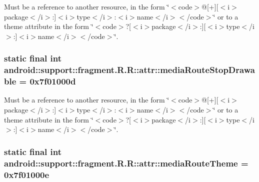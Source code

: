 Must be a reference to another resource, in the form \char`\"{}$<$code$>$@\mbox{[}+\mbox{]}\mbox{[}$<$i$>$package$<$/i$>$:\mbox{]}$<$i$>$type$<$/i$>$:$<$i$>$name$<$/i$>$$<$/code$>$\char`\"{} or to a theme attribute in the form \char`\"{}$<$code$>$?\mbox{[}$<$i$>$package$<$/i$>$:\mbox{]}\mbox{[}$<$i$>$type$<$/i$>$:\mbox{]}$<$i$>$name$<$/i$>$$<$/code$>$\char`\"{}. \hypertarget{classandroid_1_1support_1_1fragment_1_1_r_1_1attr_99419132728d2cb1385ca266adfc2c50}{
\subsubsection[{mediaRouteStopDrawable}]{\setlength{\rightskip}{0pt plus 5cm}static final int android::support::fragment.R.R::attr::mediaRouteStopDrawable = 0x7f01000d}}
\label{classandroid_1_1support_1_1fragment_1_1_r_1_1attr_99419132728d2cb1385ca266adfc2c50}


Must be a reference to another resource, in the form \char`\"{}$<$code$>$@\mbox{[}+\mbox{]}\mbox{[}$<$i$>$package$<$/i$>$:\mbox{]}$<$i$>$type$<$/i$>$:$<$i$>$name$<$/i$>$$<$/code$>$\char`\"{} or to a theme attribute in the form \char`\"{}$<$code$>$?\mbox{[}$<$i$>$package$<$/i$>$:\mbox{]}\mbox{[}$<$i$>$type$<$/i$>$:\mbox{]}$<$i$>$name$<$/i$>$$<$/code$>$\char`\"{}. \hypertarget{classandroid_1_1support_1_1fragment_1_1_r_1_1attr_6966fef08e96bd64f8aeb8b196ad9d64}{
\subsubsection[{mediaRouteTheme}]{\setlength{\rightskip}{0pt plus 5cm}static final int android::support::fragment.R.R::attr::mediaRouteTheme = 0x7f01000e}}
\label{classandroid_1_1support_1_1fragment_1_1_r_1_1attr_6966fef08e96bd64f8aeb8b196ad9d64}



